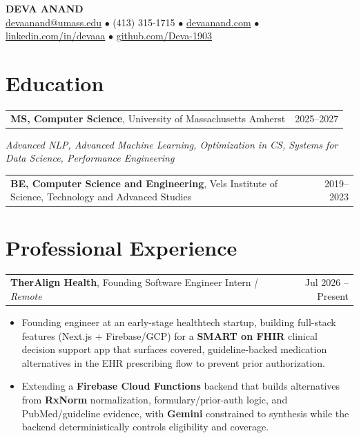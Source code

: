 \documentclass[letterpaper,11pt]{article}
\makeatletter
\newcommand{\eduItem}[3]{%
  \begin{tabular*}{\textwidth}{@{}l@{\extracolsep{\fill}}r@{}}
    \textbf{#1}, #2 & #3 \\
  \end{tabular*}\par
}
\newcommand{\expItem}[4]{%
  \vspace{2pt}
  \begin{tabular*}{\textwidth}{@{}l@{\extracolsep{\fill}}r@{}}
    \textbf{#1}, #2 \textit{| #3} & #4 \\
  \end{tabular*}\par\vspace{-3pt}
}
\makeatother
\begin{document}
\begin{center}
    {\fontsize{18}{20}\selectfont\bfseries DEVA ANAND}\\ \vspace{3pt}
    {\small
    \href{mailto:devaanand@umass.edu}{devaanand@umass.edu}
    \enspace$\bullet$\enspace
    (413) 315-1715
    \enspace$\bullet$\enspace
    \href{https://devaanand.com}{devaanand.com}
    \enspace$\bullet$\enspace
    \href{https://linkedin.com/in/devaaa/}{linkedin.com/in/devaaa}
    \enspace$\bullet$\enspace
    \href{https://github.com/Deva-1903}{github.com/Deva-1903}}
\end{center}
\vspace{-8pt}

\section{Education}
\eduItem{MS, Computer Science}{University of Massachusetts Amherst}{2025--2027}
{\small\textit{Advanced NLP, Advanced Machine Learning, Optimization in CS, Systems for Data Science, Performance Engineering}}\par
\vspace{3pt}
\eduItem{BE, Computer Science and Engineering}{Vels Institute of Science, Technology and Advanced Studies}{2019--2023}

\section{Professional Experience}

\expItem{TherAlign Health}{Founding Software Engineer Intern}{Remote}{Jul 2026 -- Present}
\begin{itemize}
  \item Founding engineer at an early-stage healthtech startup, building full-stack features (Next.js + Firebase/GCP) for a \textbf{SMART on FHIR} clinical decision support app that surfaces covered, guideline-backed medication alternatives in the EHR prescribing flow to prevent prior authorization.
  \item Extending a \textbf{Firebase Cloud Functions} backend that builds alternatives from \textbf{RxNorm} normalization, formulary/prior-auth logic, and PubMed/guideline evidence, with \textbf{Gemini} constrained to synthesis while the backend deterministically controls eligibility and coverage.
\end{itemize}
\end{document}
